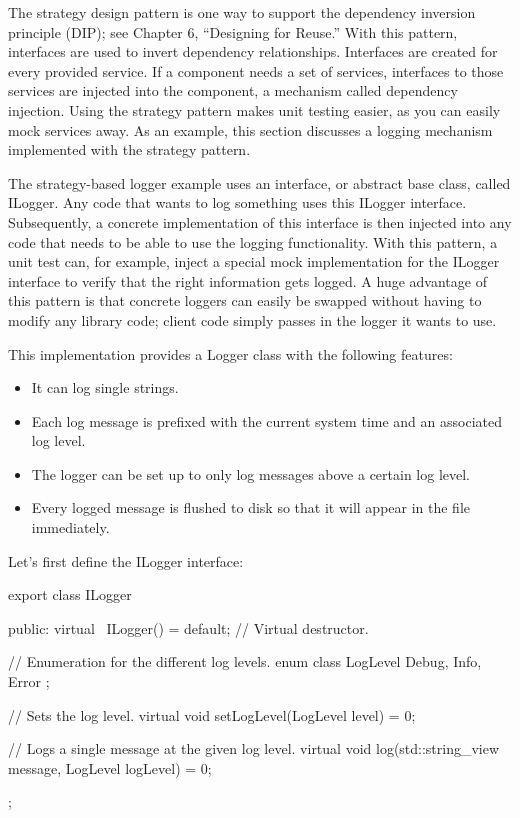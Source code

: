 
The strategy design pattern is one way to support the dependency inversion principle (DIP); see Chapter 6, “Designing for Reuse.” With this pattern, interfaces are used to invert dependency relationships. Interfaces are created for every provided service. If a component needs a set of services, interfaces to those services are injected into the component, a mechanism called dependency injection. Using the strategy pattern makes unit testing easier, as you can easily mock services away. As an example, this section discusses a logging mechanism implemented with the strategy pattern.


The strategy-based logger example uses an interface, or abstract base class, called ILogger. Any code that wants to log something uses this ILogger interface. Subsequently, a concrete implementation of this interface is then injected into any code that needs to be able to use the logging functionality. With this pattern, a unit test can, for example, inject a special mock implementation for the ILogger interface to verify that the right information gets logged. A huge advantage of this pattern is that concrete loggers can easily be swapped without having to modify any library code; client code simply passes in the logger it wants to use.


This implementation provides a Logger class with the following features:

\begin{itemize}
\item
It can log single strings.

\item
Each log message is prefixed with the current system time and an associated log level.

\item
The logger can be set up to only log messages above a certain log level.

\item
Every logged message is flushed to disk so that it will appear in the file immediately.
\end{itemize}

Let’s first define the ILogger interface:

\begin{cpp}
export class ILogger
{
    public:
        virtual ~ILogger() = default; // Virtual destructor.

        // Enumeration for the different log levels.
        enum class LogLevel { Debug, Info, Error };

        // Sets the log level.
        virtual void setLogLevel(LogLevel level) = 0;

        // Logs a single message at the given log level.
        virtual void log(std::string_view message, LogLevel logLevel) = 0;
};
\end{cpp}

